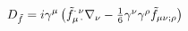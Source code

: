 \begin{equation}\label{df}
D_{\tilde f} = i\gamma^\mu \left(\tilde f_{\mu\,\cdot}^{\cdot\,\nu}\nabla_\nu  
- \textstyle{1\over 6}\gamma^\nu 
\gamma^\rho \tilde f_{\mu\nu;\rho}\right)
\end{equation}

